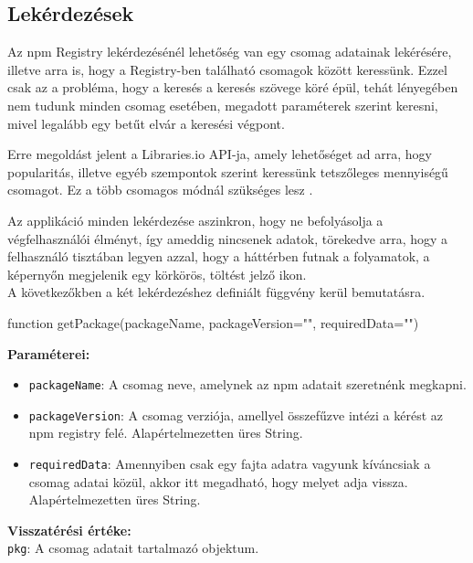 \pagebreak

\subsection{Lekérdezések}

Az npm Registry lekérdezésénél lehetőség van egy csomag adatainak lekérésére, illetve arra is, hogy a Registry-ben található csomagok között keressünk. Ezzel csak az a probléma, hogy a keresés a keresés szövege köré épül, tehát lényegében nem tudunk minden csomag esetében, megadott paraméterek szerint keresni, mivel legalább egy betűt elvár a keresési végpont.

Erre megoldást jelent a Libraries.io API-ja, amely lehetőséget ad arra, hogy popularitás, illetve egyéb szempontok szerint keressünk tetszőleges mennyiségű csomagot. Ez a több csomagos módnál szükséges lesz \cite{libraries-io}.

Az applikáció minden lekérdezése aszinkron, hogy ne befolyásolja a végfelhasználói élményt, így ameddig nincsenek adatok, törekedve arra, hogy a felhasználó tisztában legyen azzal, hogy a háttérben futnak a folyamatok, a képernyőn megjelenik egy körkörös, töltést jelző ikon.\\

A következőkben a két lekérdezéshez definiált függvény kerül bemutatásra.

\begin{js}
function getPackage(packageName, packageVersion="", requiredData="")
\end{js}

\noindent \textbf{Paraméterei:}

\begin{itemize}
	\item \texttt{packageName}: A csomag neve, amelynek az npm adatait szeretnénk megkapni.
	\item \texttt{packageVersion}: A csomag verziója, amellyel összefűzve intézi a kérést az npm registry felé. Alapértelmezetten üres String.
	\item \texttt{requiredData}: Amennyiben csak egy fajta adatra vagyunk kíváncsiak a csomag adatai közül, akkor itt megadható, hogy melyet adja vissza. Alapértelmezetten üres String.
\end{itemize}

\noindent \textbf{Visszatérési értéke:} \\

\texttt{pkg}: A csomag adatait tartalmazó objektum.\\

